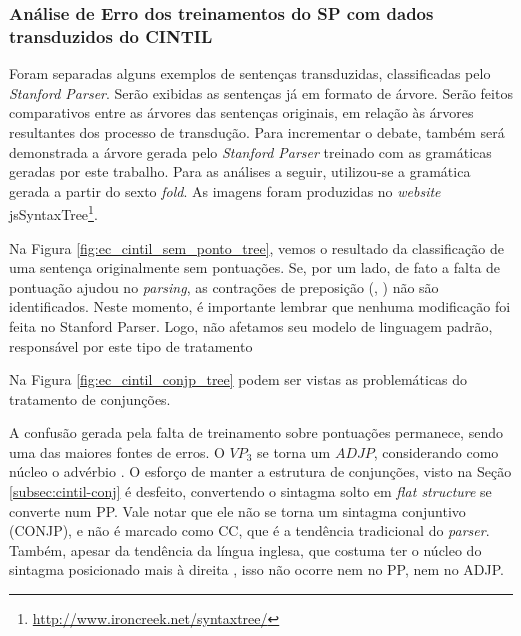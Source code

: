 \subsubsection{Análise de Erro dos treinamentos do SP com dados transduzidos do CINTIL}
\label{subsubsec:ec_cintil}

Foram separadas alguns exemplos de sentenças transduzidas, classificadas pelo \textit{Stanford Parser}. Serão exibidas as sentenças já em formato de árvore. Serão feitos comparativos entre as árvores das sentenças originais, em relação às árvores resultantes dos processo de transdução. Para incrementar o debate, também será demonstrada a árvore gerada pelo \textit{Stanford Parser} treinado com as gramáticas geradas por este trabalho. Para as análises a seguir, utilizou-se a gramática gerada a partir do sexto \textit{fold}. As imagens foram produzidas no \textit{website} jsSyntaxTree\footnote{\url{http://www.ironcreek.net/syntaxtree/}}.

\begin{center}
    
\end{center}

Na Figura \ref{fig:ec_cintil_sem_ponto_tree}, vemos o resultado da classificação de uma sentença originalmente sem pontuações. Se, por um lado, de fato a falta de pontuação ajudou no \textit{parsing}, as contrações de preposição (, ) não são identificados. Neste momento, é importante lembrar que nenhuma modificação foi feita no Stanford Parser. Logo, não afetamos seu modelo de linguagem padrão, responsável por este tipo de tratamento

\begin{center}
    
\end{center}

Na Figura \ref{fig:ec_cintil_conjp_tree} podem ser vistas as problemáticas do tratamento de conjunções.

A confusão gerada pela falta de treinamento sobre pontuações permanece, sendo uma das maiores fontes de erros. O $VP_3$  se torna um $ADJP$, considerando como núcleo o advérbio . O esforço de manter a estrutura de conjunções, visto na Seção \ref{subsec:cintil-conj} é desfeito, convertendo o sintagma solto em \textit{flat structure}  se converte num PP. Vale notar que ele não se torna um sintagma conjuntivo (CONJP), e  não é marcado como CC, que é a tendência tradicional do \textit{parser}. Também, apesar da tendência da língua inglesa, que costuma ter o núcleo do sintagma posicionado mais à direita \cite[p~40]{charniak97statistical}, isso não ocorre nem no PP, nem no ADJP.

